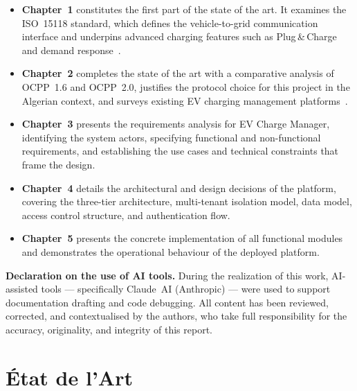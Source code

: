 \documentclass[12pt,a4paper]{report}
\begin{document}
\begin{itemize}
  \item \textbf{Chapter~1} constitutes the first part of the state of the art. It examines the
        ISO~15118 standard, which defines the vehicle-to-grid communication interface and underpins
        advanced charging features such as Plug\,\&\,Charge and demand
        response~\autocite{iso15118_2022}.

  \item \textbf{Chapter~2} completes the state of the art with a comparative analysis of
        OCPP~1.6 and OCPP~2.0, justifies the protocol choice for this project in the Algerian
        context, and surveys existing EV charging management
        platforms~\autocite{ocpp16_ed2, ocpp201}.

  \item \textbf{Chapter~3} presents the requirements analysis for EV Charge Manager, identifying
        the system actors, specifying functional and non-functional requirements, and establishing
        the use cases and technical constraints that frame the design.

  \item \textbf{Chapter~4} details the architectural and design decisions of the platform,
        covering the three-tier architecture, multi-tenant isolation model, data model, access
        control structure, and authentication flow.

  \item \textbf{Chapter~5} presents the concrete implementation of all functional modules and
        demonstrates the operational behaviour of the deployed platform.
\end{itemize}

\medskip
\noindent\textbf{Declaration on the use of AI tools.} During the realization of this work,
AI-assisted tools --- specifically Claude~AI (Anthropic) --- were used to support documentation
drafting and code debugging. All content has been reviewed, corrected, and contextualised by
the authors, who take full responsibility for the accuracy, originality, and integrity of this
report.

\clearpage


\part*{État de l'Art}
\end{document}
